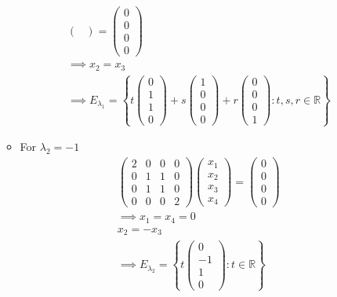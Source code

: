 \begin{enumerate}
\begin{itemize}
\begin{gather}
\begin{pmatrix}
\end{pmatrix}
=
\begin{pmatrix}
0\\0\\0\\0
\end{pmatrix}\\
\implies x_2 = x_3\\
\implies E_{\lambda_1} =
\left\{t\begin{pmatrix}0\\1\\1\\0\end{pmatrix} +
  s \begin{pmatrix}1\\0\\0\\0\end{pmatrix} +
  r\begin{pmatrix}0\\0\\0\\1\end{pmatrix}\colon t,s,r \in \mathbb{R}\right\}
\end{gather}
\item For $\lambda_2 = -1$
\begin{gather}
\begin{pmatrix}
2 & 0 & 0 & 0\\
0 & 1 & 1 & 0\\
0 & 1 & 1 & 0\\
0 & 0 & 0 & 2
\end{pmatrix}
\begin{pmatrix}
x_1\\x_2\\x_3\\x_4
\end{pmatrix}
=
\begin{pmatrix}
0\\0\\0\\0
\end{pmatrix}\\
\implies x_1 = x_4 =0\\
x_2 = -x_3\\
\implies E_{\lambda_2} =
\left\{t\begin{pmatrix}0\\-1\\1\\0\end{pmatrix}\colon t \in \mathbb{R}\right\}

\end{gather}
\end{itemize}
\end{enumerate}
